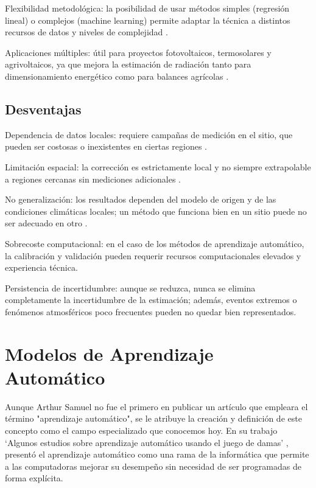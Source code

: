 Flexibilidad metodológica: la posibilidad de usar métodos simples (regresión lineal) o complejos (machine learning) permite adaptar la técnica a distintos recursos de datos y niveles de complejidad \citep{NARVAEZ2021, YANG2021}.

Aplicaciones múltiples: útil para proyectos fotovoltaicos, termosolares y agrivoltaicos, ya que mejora la estimación de radiación tanto para dimensionamiento energético como para balances agrícolas \citep{ZAINALI2024}.

\subsection*{Desventajas}

Dependencia de datos locales: requiere campañas de medición en el sitio, que pueden ser costosas o inexistentes en ciertas regiones \citep{Quansah2024}.

Limitación espacial: la corrección es estrictamente local y no siempre extrapolable a regiones cercanas sin mediciones adicionales \citep{POLO2020}.

No generalización: los resultados dependen del modelo de origen y de las condiciones climáticas locales; un método que funciona bien en un sitio puede no ser adecuado en otro \citep{Fernández2020, ZAINALI2024}.

Sobrecoste computacional: en el caso de los métodos de aprendizaje automático, la calibración y validación pueden requerir recursos computacionales elevados y experiencia técnica.

Persistencia de incertidumbre: aunque se reduzca, nunca se elimina completamente la incertidumbre de la estimación; además, eventos extremos o fenómenos atmosféricos poco frecuentes pueden no quedar bien representados.





\section{Modelos de Aprendizaje Automático} \label{MLM}
Aunque Arthur Samuel no fue el primero en publicar un artículo que empleara el término "aprendizaje automático", se le atribuye la creación y definición de este concepto como el campo especializado que conocemos hoy. En su trabajo `Algunos estudios sobre aprendizaje automático usando el juego de damas' \cite{samuel1959}, presentó el aprendizaje automático como una rama de la informática que permite a las computadoras mejorar su desempeño sin necesidad de ser programadas de forma explícita.

